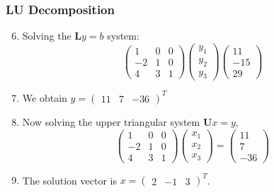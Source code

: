\documentclass[10pt,compress]{beamer}
\begin{document}
\begin{frame}
  \frametitle{LU Decomposition} 
  \begin{enumerate}
  \setcounter{enumi}{5}
     \item <1-> Solving the $\bm{L}y=b$ system:
        \begin{displaymath}
          \begin{pmatrix}
             1 & 0 & 0 \\ -2 & 1 & 0 \\ 4 & 3 & 1
          \end{pmatrix}
          \begin{pmatrix}
            y_{1} \\ y_{2} \\ y_{3}
          \end{pmatrix}
          \begin{pmatrix}
            11 \\ -15 \\ 29
          \end{pmatrix}
        \end{displaymath}
     \item <2-> We obtain $y=\begin{pmatrix}11 & 7 & -36\end{pmatrix}^{T}$
     \item <3-> Now solving the upper triangular system $\bm{U}x=y$,
        \begin{displaymath}
          \begin{pmatrix}
            1 & 0 & 0 \\ -2 & 1 & 0 \\ 4 & 3 & 1
          \end{pmatrix}
          \begin{pmatrix}
           x_{1} \\ x_{2} \\ x_{3}
          \end{pmatrix}=
          \begin{pmatrix}
             11 \\ 7 \\ -36
          \end{pmatrix}
        \end{displaymath}
     \item <4-> The solution vector is $x=\begin{pmatrix}2 & -1 & 3 \end{pmatrix}^{T}$.
  \end{enumerate}
\end{frame}
\end{document}
